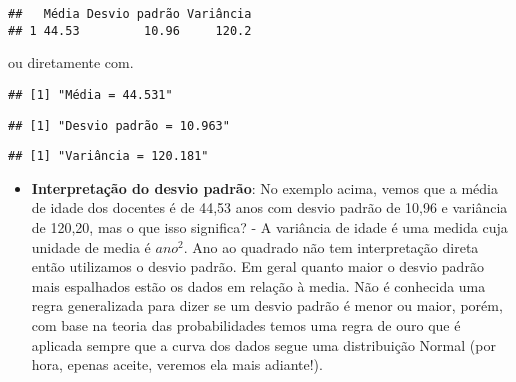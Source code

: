 \documentclass[11pt,]{style/krantz}
\makeatletter
\newenvironment{Shaded}{\begin{snugshade}}{\end{snugshade}}
\newcommand{\DecValTok}[1]{\textcolor[rgb]{0.00,0.00,0.81}{#1}}
\newcommand{\KeywordTok}[1]{\textcolor[rgb]{0.13,0.29,0.53}{\textbf{#1}}}
\newcommand{\NormalTok}[1]{#1}
\newcommand{\OperatorTok}[1]{\textcolor[rgb]{0.81,0.36,0.00}{\textbf{#1}}}
\newcommand{\StringTok}[1]{\textcolor[rgb]{0.31,0.60,0.02}{#1}}
\providecommand{\tightlist}{%
  \setlength{\itemsep}{0pt}\setlength{\parskip}{0pt}}
\newenvironment{kframe}{%
\medskip{}
\setlength{\fboxsep}{.8em}
 \def\at@end@of@kframe{}%
 \ifinner\ifhmode%
  \def\at@end@of@kframe{\end{minipage}}%
  \begin{minipage}{\columnwidth}%
 \fi\fi%
 \def\FrameCommand##1{\hskip\@totalleftmargin \hskip-\fboxsep
 \colorbox{shadecolor}{##1}\hskip-\fboxsep
     \hskip-\linewidth \hskip-\@totalleftmargin \hskip\columnwidth}%
 \MakeFramed {\advance\hsize-\width
   \@totalleftmargin\z@ \linewidth\hsize
   \@setminipage}}%
 {\par\unskip\endMakeFramed%
 \at@end@of@kframe}
\renewenvironment{Shaded}{\begin{kframe}}{\end{kframe}}
\theoremstyle{definition}
\theoremstyle{definition}
\theoremstyle{definition}
\theoremstyle{remark}
\makeatother
\begin{document}
\begin{verbatim}
##   Média Desvio padrão Variância
## 1 44.53         10.96     120.2
\end{verbatim}

ou diretamente com.

\begin{Shaded}
\end{Shaded}

\begin{verbatim}
## [1] "Média = 44.531"
\end{verbatim}

\begin{Shaded}
\end{Shaded}

\begin{verbatim}
## [1] "Desvio padrão = 10.963"
\end{verbatim}

\begin{Shaded}
\end{Shaded}

\begin{verbatim}
## [1] "Variância = 120.181"
\end{verbatim}

\begin{itemize}
\tightlist
\item
  \textbf{Interpretação do desvio padrão}: No exemplo acima, vemos que a média de idade dos docentes é de 44,53 anos com desvio padrão de 10,96 e variância de 120,20, mas o que isso significa? - A variância de idade é uma medida cuja unidade de media é \(ano^2\). Ano ao quadrado não tem interpretação direta então utilizamos o desvio padrão. Em geral quanto maior o desvio padrão mais espalhados estão os dados em relação à media. Não é conhecida uma regra generalizada para dizer se um desvio padrão é menor ou maior, porém, com base na teoria das probabilidades temos uma regra de ouro que é aplicada sempre que a curva dos dados segue uma distribuição Normal (por hora, epenas aceite, veremos ela mais adiante!).
\end{itemize}
\end{document}
